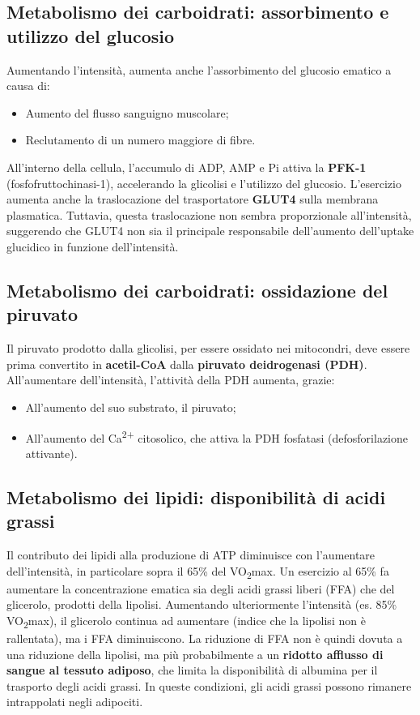 \documentclass[12pt,a4paper]{report}
\begin{document}
\subsection{Metabolismo dei carboidrati: assorbimento e utilizzo del glucosio}
Aumentando l'intensità, aumenta anche l'assorbimento del glucosio ematico a causa di:
\begin{itemize}
\item Aumento del flusso sanguigno muscolare;
\item Reclutamento di un numero maggiore di fibre.
\end{itemize}
All'interno della cellula, l'accumulo di ADP, AMP e Pi attiva la \textbf{PFK-1} (fosfofruttochinasi-1), accelerando la glicolisi e l'utilizzo del glucosio.
L'esercizio aumenta anche la traslocazione del trasportatore \textbf{GLUT4} sulla membrana plasmatica. Tuttavia, questa traslocazione non sembra proporzionale all'intensità, suggerendo che GLUT4 non sia il principale responsabile dell'aumento dell'uptake glucidico in funzione dell'intensità.
\subsection{Metabolismo dei carboidrati: ossidazione del piruvato}
Il piruvato prodotto dalla glicolisi, per essere ossidato nei mitocondri, deve essere prima convertito in \textbf{acetil-CoA} dalla \textbf{piruvato deidrogenasi (PDH)}.
All'aumentare dell'intensità, l'attività della PDH aumenta, grazie:
\begin{itemize}
\item All'aumento del suo substrato, il piruvato;
\item All'aumento del Ca\textsuperscript{2+} citosolico, che attiva la PDH fosfatasi (defosforilazione attivante).
\end{itemize}
\subsection{Metabolismo dei lipidi: disponibilità di acidi grassi}
Il contributo dei lipidi alla produzione di ATP diminuisce con l'aumentare dell'intensità, in particolare sopra il 65\% del VO\textsubscript{2}max.
Un esercizio al 65\% fa aumentare la concentrazione ematica sia degli acidi grassi liberi (FFA) che del glicerolo, prodotti della lipolisi. Aumentando ulteriormente l'intensità (es. 85\% VO\textsubscript{2}max), il glicerolo continua ad aumentare (indice che la lipolisi non è rallentata), ma i FFA diminuiscono.
La riduzione di FFA non è quindi dovuta a una riduzione della lipolisi, ma più probabilmente a un \textbf{ridotto afflusso di sangue al tessuto adiposo}, che limita la disponibilità di albumina per il trasporto degli acidi grassi. In queste condizioni, gli acidi grassi possono rimanere intrappolati negli adipociti.
\end{document}
